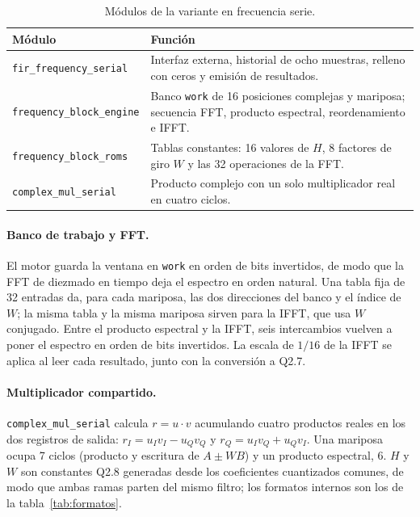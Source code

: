 \begin{table}[h]
  \centering
  \caption{Módulos de la variante en frecuencia serie.}\label{tab:frec-modulos}
  \begin{tabular}{lp{9cm}}
    \toprule
    Módulo & Función \\
    \midrule
    \texttt{fir\_frequency\_serial} & Interfaz externa, historial de ocho muestras, relleno con ceros y emisión de resultados. \\
    \texttt{frequency\_block\_engine} & Banco \texttt{work} de 16 posiciones complejas y mariposa; secuencia FFT, producto espectral, reordenamiento e IFFT. \\
    \texttt{frequency\_block\_roms} & Tablas constantes: 16 valores de $H$, 8 factores de giro $W$ y las 32 operaciones de la FFT. \\
    \texttt{complex\_mul\_serial} & Producto complejo con un solo multiplicador real en cuatro ciclos. \\
    \bottomrule
  \end{tabular}
\end{table}

\paragraph{Banco de trabajo y FFT.} El motor guarda la ventana en \texttt{work} en orden de bits invertidos, de modo que la FFT de diezmado en tiempo deja el espectro en orden natural. Una tabla fija de 32 entradas da, para cada mariposa, las dos direcciones del banco y el índice de $W$; la misma tabla y la misma mariposa sirven para la IFFT, que usa $W$ conjugado. Entre el producto espectral y la IFFT, seis intercambios vuelven a poner el espectro en orden de bits invertidos. La escala de $1/16$ de la IFFT se aplica al leer cada resultado, junto con la conversión a Q2.7.

\paragraph{Multiplicador compartido.} \texttt{complex\_mul\_serial} calcula $r = u \cdot v$ acumulando cuatro productos reales en los dos registros de salida: $r_I = u_I v_I - u_Q v_Q$ y $r_Q = u_I v_Q + u_Q v_I$. Una mariposa ocupa 7 ciclos (producto y escritura de $A \pm W B$) y un producto espectral, 6. $H$ y $W$ son constantes Q2.8 generadas desde los coeficientes cuantizados comunes, de modo que ambas ramas parten del mismo filtro; los formatos internos son los de la tabla~\ref{tab:formatos}.

